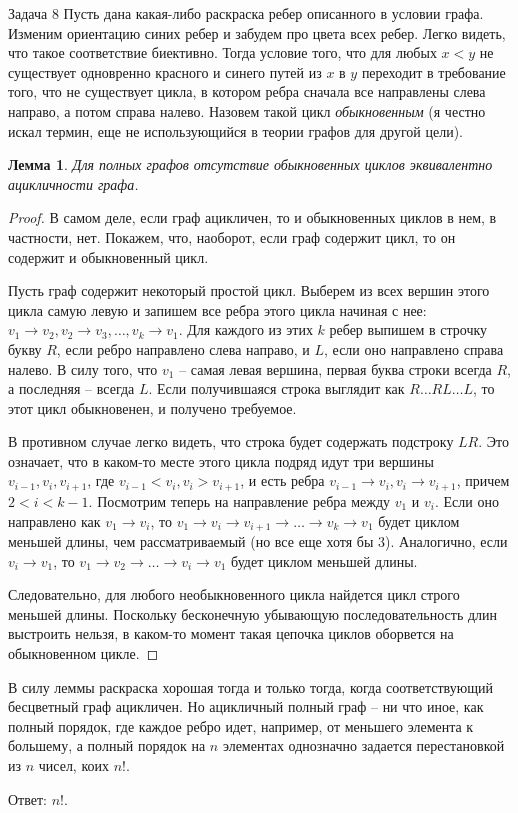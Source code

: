 \documentclass{article}
\newtheorem{lemma}{Лемма}
\begin{document}
	\begin{section}{Задача 8}
		Пусть дана какая-либо раскраска ребер описанного в условии графа. Изменим ориентацию синих ребер и забудем про цвета всех ребер. Легко видеть, что такое соответствие биективно. Тогда условие того, что для любых $x < y$ не существует одновренно красного и синего путей из $x$ в $y$ переходит в требование того, что не существует цикла, в котором ребра сначала все направлены слева направо, а потом справа налево. Назовем такой цикл \textit{обыкновенным} (я честно искал термин, еще не использующийся в теории графов для другой цели).

		\begin{lemma}
			Для полных графов отсутствие обыкновенных циклов эквивалентно ацикличности графа.
		\end{lemma}

		\begin{proof}
			В самом деле, если граф ацикличен, то и обыкновенных циклов в нем, в частности, нет. Покажем, что, наоборот, если граф содержит цикл, то он содержит и обыкновенный цикл.

			Пусть граф содержит некоторый простой цикл. Выберем из всех вершин этого цикла самую левую и запишем все ребра этого цикла начиная с нее: $v_1 \to v_2, v_2 \to v_3, \dots, v_k \to v_1$. Для каждого из этих $k$ ребер выпишем в строчку букву $R$, если ребро направлено слева направо, и $L$, если оно направлено справа налево. В силу того, что $v_1$ -- самая левая вершина, первая буква строки всегда $R$, а последняя -- всегда $L$. Если получившаяся строка выглядит как $R \dots RL \dots L$, то этот цикл обыкновенен, и получено требуемое.

			В противном случае легко видеть, что строка будет содержать подстроку $LR$. Это означает, что в каком-то месте этого цикла подряд идут три вершины $v_{i-1}, v_i, v_{i+1}$, где $v_{i-1} < v_i, v_i > v_{i+1}$, и есть ребра $v_{i-1} \to v_i, v_i \to v_{i+1}$, причем $2 < i < k-1$. Посмотрим теперь на направление ребра между $v_1$ и $v_i$. Если оно направлено как $v_1 \to v_i$, то $v_1 \to v_i \to v_{i+1} \to \dots \to v_k \to v_1$ будет циклом меньшей длины, чем рассматриваемый (но все еще хотя бы $3$). Аналогично, если $v_i \to v_1$, то $v_1 \to v_2 \to \dots \to v_i \to v_1$ будет циклом меньшей длины.

			Следовательно, для любого необыкновенного цикла найдется цикл строго меньшей длины. Поскольку бесконечную убывающую последовательность длин выстроить нельзя, в каком-то момент такая цепочка циклов оборвется на обыкновенном цикле.
		\end{proof}

		В силу леммы раскраска хорошая тогда и только тогда, когда соответствующий бесцветный граф ацикличен. Но ацикличный полный граф -- ни что иное, как полный порядок, где каждое ребро идет, например, от меньшего элемента к большему, а полный порядок на $n$ элементах однозначно задается перестановкой из $n$ чисел, коих $n!$.

		Ответ: $n!$.
	\end{section}
\end{document}
